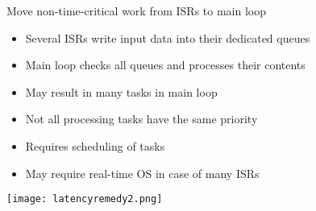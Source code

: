\begin{theorem}{Move non-time-critical work from ISRs to main loop}
    \begin{itemize}
        \item Several ISRs write input data into their dedicated queues
        \item Main loop checks all queues and processes their contents
        \item May result in many tasks in main loop
        \item Not all processing tasks have the same priority
        \item Requires scheduling of tasks
        \item May require real-time OS in case of many ISRs
    \end{itemize}

\texttt{[image: latencyremedy2.png]}
    
\end{theorem}

